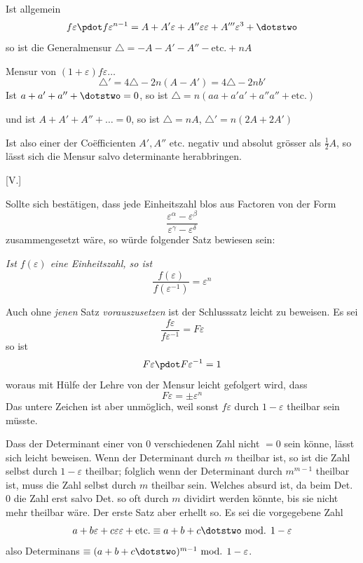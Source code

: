 Ist allgemein
\[
f\varepsilon\pdot f\varepsilon^{n-1}=A+A'\varepsilon+A''\varepsilon\varepsilon+A'''\varepsilon^3+\dotstwo
\]
so ist die Generalmensur $\triangle=-A-A'-A''-\text{etc.}+nA$

Mensur von $(1+\varepsilon)f\varepsilon\ldots$
\[
\triangle'=4\triangle-2n(A-A')=4\triangle-2nb'
\]
Ist $a+a'+a''+\dotstwo=0$, so ist $\triangle=n(aa+a'a'+a''a''+\text{etc.})$

und ist $A+A'+A''+\ldots=0$, so ist $\triangle=nA$, $\triangle'=n(2A+2A')$

Ist also einer der Coëfficienten $A',A''$ etc. negativ und absolut grösser als $\frac12A$, so lässt sich die Mensur salvo determinante herabbringen.

%
\begin{center}[V.]\end{center}
Sollte sich bestätigen, dass jede Einheitszahl blos aus Factoren von der Form
\[
\frac{\varepsilon^\alpha-\varepsilon^\beta}{\varepsilon^\gamma-\varepsilon^\delta}
\]
zusammengesetzt wäre, so würde folgender Satz bewiesen sein:

\emph{Ist $f(\varepsilon)$ eine Einheitszahl, so ist}
\[
\frac{f(\varepsilon)}{f(\varepsilon^{-1})}=\varepsilon^n
\]

Auch ohne \emph{jenen} Satz \emph{vorauszusetzen} ist der Schlusssatz leicht zu beweisen.
Es sei
\[
\frac{f\varepsilon}{f\varepsilon^{-1}}=F\varepsilon
\]
so ist
\[
F\varepsilon\pdot F\varepsilon^{-1}=1
\]
woraus mit Hülfe der Lehre von der Mensur leicht gefolgert wird, dass
\[
F\varepsilon=\pm\varepsilon^n
\]
Das untere Zeichen ist aber unmöglich, weil sonst $f\varepsilon$ durch $1-\varepsilon$ theilbar sein müsste.

Dass der Determinant einer von $0$ verschiedenen Zahl nicht $=0$ sein könne, lässt sich leicht beweisen. Wenn der Determinant durch $m$ theilbar ist, so ist die Zahl selbst durch $1-\varepsilon$ theilbar; folglich wenn der Determinant durch $m^{m-1}$ theilbar ist, muss die Zahl selbst durch $m$ theilbar sein. Welches absurd ist, da beim Det. $0$ die Zahl erst salvo Det. so oft durch $m$ dividirt werden könnte, bis sie nicht mehr theilbar wäre. Der erste Satz aber erhellt so. Es sei die vorgegebene Zahl
\[
a+b\varepsilon+c\varepsilon\varepsilon+\text{etc.}\equiv a+b+c\dotstwo\text{ mod. }1-\varepsilon
\]
also Determinans $\equiv(a+b+c\dotstwo)^{m-1}\text{ mod. }1-\varepsilon$.

